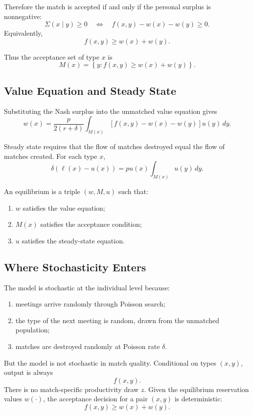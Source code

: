 \documentclass[11pt]{article}
\newcommand{\1}{\mathbf{1}}
\begin{document}
Therefore the match is accepted if and only if the personal surplus is nonnegative:
\[
\Sigma(x\mid y)\geq 0
\quad\Longleftrightarrow\quad
f(x,y)-w(x)-w(y)\geq 0.
\]
Equivalently,
\[
\boxed{f(x,y)\geq w(x)+w(y).}
\]

Thus the acceptance set of type $x$ is
\[
M(x)=\left\{y: f(x,y)\geq w(x)+w(y)\right\}.
\]

\subsection{Value Equation and Steady State}

Substituting the Nash surplus into the unmatched value equation gives
\[
w(x)
=
\frac{p}{2(r+\delta)}
\int_{M(x)}
\left[f(x,y)-w(x)-w(y)\right]u(y)\,dy.
\]

Steady state requires that the flow of matches destroyed equal the flow of matches created. For each type $x$,
\[
\delta\left(\ell(x)-u(x)\right)
=
p u(x)\int_{M(x)}u(y)\,dy.
\]

An equilibrium is a triple $(w,M,u)$ such that:
\begin{enumerate}[label=(\alph*)]
    \item $w$ satisfies the value equation;
    \item $M(x)$ satisfies the acceptance condition;
    \item $u$ satisfies the steady-state equation.
\end{enumerate}

\subsection{Where Stochasticity Enters}

The model is stochastic at the individual level because:
\begin{enumerate}
    \item meetings arrive randomly through Poisson search;
    \item the type of the next meeting is random, drawn from the unmatched population;
    \item matches are destroyed randomly at Poisson rate $\delta$.
\end{enumerate}

But the model is not stochastic in match quality. Conditional on types $(x,y)$, output is always
\[
f(x,y).
\]
There is no match-specific productivity draw $z$. Given the equilibrium reservation values $w(\cdot)$, the acceptance decision for a pair $(x,y)$ is deterministic:
\[
f(x,y)\geq w(x)+w(y).
\]
\end{document}
